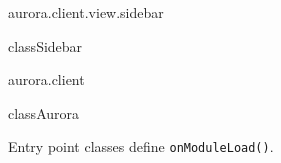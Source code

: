 \begin{texdocpackage}{aurora.client.view.sidebar}
\label{texdoclet:aurora.client.view.sidebar}

\begin{texdocclass}{class}{Sidebar}
\label{texdoclet:aurora.client.view.sidebar.Sidebar}
\begin{texdocclassintro}
\end{texdocclassintro}
\begin{texdocclassconstructors}
\end{texdocclassconstructors}
\end{texdocclass}


\end{texdocpackage}



\begin{texdocpackage}{aurora.client}
\label{texdoclet:aurora.client}

\begin{texdocclass}{class}{Aurora}
\label{texdoclet:aurora.client.Aurora}
\begin{texdocclassintro}
Entry point classes define \texttt{onModuleLoad()}.\end{texdocclassintro}
\begin{texdocclassconstructors}
\end{texdocclassconstructors}
\begin{texdocclassmethods}
\end{texdocclassmethods}
\end{texdocclass}


\end{texdocpackage}



